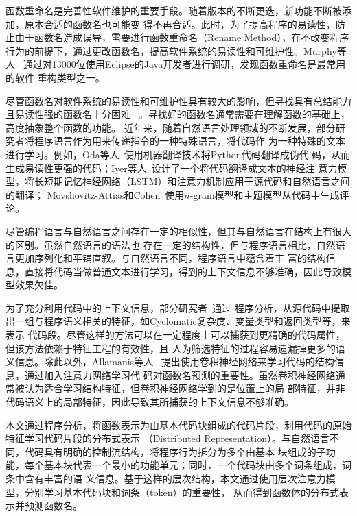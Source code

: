函数重命名是完善性软件维护的重要手段。随着版本的不断更迭，新功能不断被添加，原本合适的函数名也可能变
得不再合适。此时，为了提高程序的易读性，防止由于函数名造成误导，需要进行函数重命名（Rename
Method），在不改变程序行为的前提下，通过更改函数名，提高软件系统的易读性和可维护性。Murphy等人
~\cite{Murphy-Hill:ICSE09}通过对13000位使用Eclipse的Java开发者进行调研，发现函数重命名是最常用的软件
重构类型之一。

尽管函数名对软件系统的易读性和可维护性具有较大的影响，但寻找具有总结能力且易读性强的函数名十分困难
~\cite{allamanis2015suggesting}。寻找好的函数名通常需要在理解函数的基础上，高度抽象整个函数的功能。
近年来，随着自然语言处理领域的不断发展，部分研究者将程序语言作为用来传递指令的一种特殊语言，将代码作
为一种特殊的文本进行学习。例如，Oda等人~\cite{oda2015learning}使用机器翻译技术将Python代码翻译成伪代
码，从而生成易读性更强的代码；Iyer等人~\cite{iyer2016summarizing}设计了一个将代码翻译成文本的神经注
意力模型，将长短期记忆神经网络（LSTM）和注意力机制应用于源代码和自然语言之间的翻译；
Movshovitz-Attias和Cohen~\cite{movshovitz2013natural}使用$n$-gram模型和主题模型从代码中生成评论。

尽管编程语言与自然语言之间存在一定的相似性，但其与自然语言在结构上有很大的区别。虽然自然语言的语法也
存在一定的结构性，但与程序语言相比，自然语言更加序列化和平铺直叙。与自然语言不同，程序语言中蕴含着丰
富的结构信息，直接将代码当做普通文本进行学习，得到的上下文信息不够准确，因此导致模型效果欠佳。

为了充分利用代码中的上下文信息，部分研究者~\cite{allamanis2015suggesting, haiduc2010supporting}通过
程序分析，从源代码中提取出一组与程序语义相关的特征，如Cyclomatic复杂度、变量类型和返回类型等，来表示
代码段。尽管这样的方法可以在一定程度上可以捕获到更精确的代码属性，但该方法依赖于特征工程的有效性，且
人为筛选特征的过程容易遗漏掉更多的语义信息。除此以外，Allamanis等人
~\cite{allamanis2016convolutional}提出使用卷积神经网络来学习代码的结构信息，通过加入注意力网络学习代
码对函数名预测的重要性。虽然卷积神经网络通常被认为适合学习结构特征，但卷积神经网络学到的是位置上的局
部特征，并非代码语义上的局部特征，因此导致其所捕获的上下文信息不够准确。

本文通过程序分析，将函数表示为由基本代码块组成的代码片段，利用代码的原始特征学习代码片段的分布式表示
（Distributed Representation）。与自然语言不同，代码具有明确的控制流结构，将程序行为拆分为多个由基本
块组成的子功能，每个基本块代表一个最小的功能单元；同时，一个代码块由多个词条组成，词条中含有丰富的语
义信息。基于这样的层次结构，本文通过使用层次注意力模型，分别学习基本代码块和词条（token）的重要性，
从而得到函数体的分布式表示并预测函数名。

